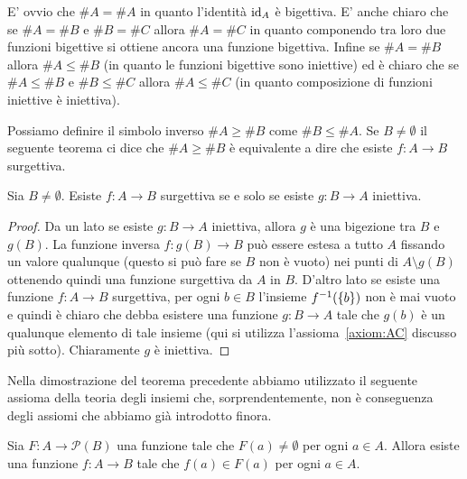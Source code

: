 E' ovvio che $\#A = \#A$ in quanto l'identità $\mathrm{id}_A$ è bigettiva.
E' anche chiaro che se $\#A = \#B$ e $\#B = \#C$ allora $\#A = \#C$ in quanto 
componendo tra loro due funzioni bigettive si ottiene ancora una funzione 
bigettiva. 
Infine se $\#A = \#B$ allora $\#A \le \#B$ (in quanto le funzioni bigettive 
sono iniettive) ed è chiaro che se $\#A \le \#B$ e $\#B \le \#C$ allora 
$\#A\le \#C$ (in quanto composizione di funzioni iniettive è iniettiva).

Possiamo definire il simbolo inverso $\#A \ge \#B$ 
come $\#B\le \#A$.
Se $B\neq \emptyset$ 
il seguente teorema ci dice che $\#A \ge \#B$ 
è equivalente a dire che 
esiste $f\colon A \to B$
surgettiva. 
%

\begin{theorem}\label{th:95444}
  Sia $B\neq \emptyset$.
  Esiste $f\colon A\to B$ surgettiva 
  se e solo se esiste $g\colon B\to A$ iniettiva.
\end{theorem}
% 
\begin{proof}
Da un lato se esiste $g\colon B\to A$ iniettiva, allora $g$ è una bigezione 
tra $B$ e $g(B)$. La funzione inversa $f\colon g(B) \to B$ 
può essere estesa a tutto $A$ fissando un valore qualunque 
(questo si può fare se $B$ non è vuoto) nei punti di $A\setminus g(B)$
ottenendo quindi una funzione surgettiva da $A$ in $B$.
D'altro lato se esiste una funzione $f\colon A\to B$ surgettiva,
per ogni $b\in B$ l'insieme $f^{-1}({\left\{ b \right\}})$ non è mai 
vuoto e quindi è chiaro che debba esistere 
una funzione $g\colon B\to A$ tale che $g(b)$ è un qualunque elemento 
di tale insieme
(qui si utilizza l'assioma~\ref{axiom:AC} discusso più sotto). 
Chiaramente $g$ è iniettiva.
\end{proof}

Nella dimostrazione del teorema precedente abbiamo utilizzato il seguente assioma 
della teoria degli insiemi che, sorprendentemente, non è conseguenza degli assiomi 
che abbiamo già introdotto finora.

\begin{axiom}%
  \label{axiom:AC}%
  Sia $F\colon A \to \mathcal P(B)$
  una funzione tale che $F(a)\neq \emptyset$ 
  per ogni $a\in A$. Allora esiste una funzione
  $f\colon A \to B$ tale che $f(a)\in F(a)$
  per ogni $a\in A$.
\end{axiom}

